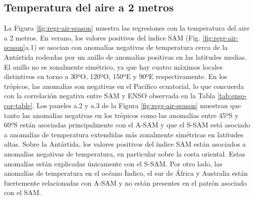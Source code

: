 \documentclass[12pt,oneside,a4paper]{reedthesis}
\begin{document}
\hypertarget{temperatura-del-aire-a-2-metros}{%
\subsection{Temperatura del aire a 2 metros}\label{temperatura-del-aire-a-2-metros}}

La Figura \ref{fig:regr-air-season} muestra las regresiones con la temperatura del aire a 2 metros.
En verano, los valores positivos del índice SAM (Fig. \ref{fig:regr-air-season}a.1) se asocian con anomalías negativas de temperatura cerca de la Antártida rodeadas por un anillo de anomalías positivas en las latitudes medias.
El anillo no es zonalmente simétrico, ya que hay cuatro máximos locales distintivos en torno a 30ºO, 120ºO, 150ºE y 90ºE respectivamente.
En los trópicos, las anomalías son negativas en el Pacífico ecuatorial, lo que concuerda con la correlación negativa entre SAM y ENSO observada en la Tabla \ref{tab:enso-cor-table}.
Los paneles a.2 y a.3 de la Figura \ref{fig:regr-air-season} muestran que tanto las anomalías negativas en los trópicos como las anomalías entre 45ºS y 60ºS están asociadas principalmente con el A-SAM y que el S-SAM está asociado a anomalías de temperatura extendidas más zonalmente simétricas en latitudes altas.
Sobre la Antártida, los valores positivos del índice SAM están asociados a anomalías negativas de temperatura, en particular sobre la costa oriental.
Estas anomalías están explicadas únicamente con el S-SAM.
Por otro lado, las anomalías de temperatura en el océano Índico, el sur de África y Australia están fuertemente relacionadas con A-SAM y no están presentes en el patrón asociado con el SAM.
\end{document}
